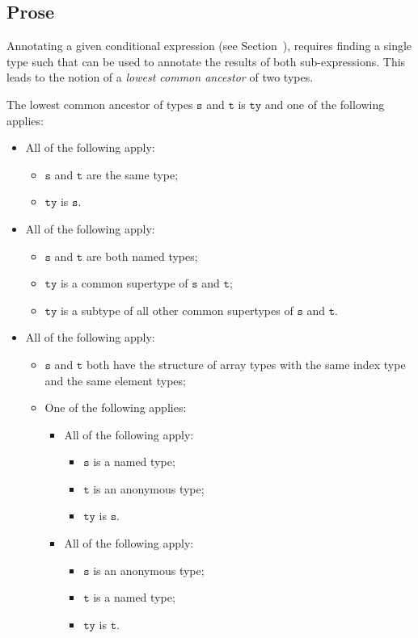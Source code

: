 \documentclass{book}
\newcommand\vt[0]{\texttt{t}}
\newcommand\vs[0]{\texttt{s}}
\newcommand\tty[0]{\texttt{ty}}
\begin{document}
\subsection{Prose}
  Annotating a given conditional expression (see Section~),
  requires finding a single type such that can be used to annotate the results of both sub-expressions.
  This leads to the notion of a \emph{lowest common ancestor} of two types.

  The lowest common ancestor of types $\vs$ and $\vt$ is $\tty$ and one of the following applies:
  \begin{itemize}
  \item All of the following apply:
    \begin{itemize}
    \item $\vs$ and $\vt$ are the same type;
    \item $\tty$ is $\vs$.
    \end{itemize}

  \item All of the following apply:
    \begin{itemize}
    \item $\vs$ and $\vt$ are both named types;
    \item $\tty$ is a common supertype of $\vs$ and $\vt$;
    \item $\tty$ is a subtype of all other common supertypes of $\vs$ and $\vt$.
    \end{itemize}

  \item All of the following apply:
    \begin{itemize}
    \item $\vs$ and $\vt$ both have the structure of array types with the same index type
      and the same element types;

    \item One of the following applies:
      \begin{itemize}
      \item All of the following apply:
        \begin{itemize}
        \item $\vs$ is a named type;
        \item $\vt$ is an anonymous type;
        \item $\tty$ is $\vs$.
        \end{itemize}

      \item All of the following apply:
        \begin{itemize}
        \item $\vs$ is an anonymous type;
        \item $\vt$ is a named type;
        \item $\tty$ is $\vt$.
        \end{itemize}
      \end{itemize}
    \end{itemize}


\end{itemize}
\end{document}
